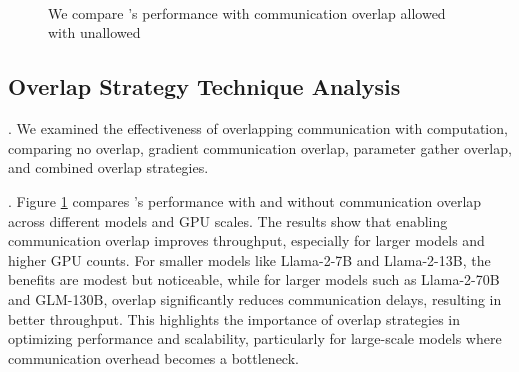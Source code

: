 

\begin{figure}[htbp]
  \centering
    \\
    \addtocounter{subfigure}{-1}
    
    \\
    \\
  \caption{
  We compare \sysname's performance with communication overlap allowed with unallowed
  }
  \label{fig:ablation:overlap}
\end{figure}

\subsection{Overlap Strategy Technique Analysis}

. We examined the effectiveness of overlapping communication with computation, comparing no overlap, gradient communication overlap, parameter gather overlap, and combined overlap strategies.

.
Figure \ref{fig:ablation:overlap} compares \sysname’s performance with and without communication overlap across different models and GPU scales. The results show that enabling communication overlap improves throughput, especially for larger models and higher GPU counts. For smaller models like Llama-2-7B and Llama-2-13B, the benefits are modest but noticeable, while for larger models such as Llama-2-70B and GLM-130B, overlap significantly reduces communication delays, resulting in better throughput. This highlights the importance of overlap strategies in optimizing performance and scalability, particularly for large-scale models where communication overhead becomes a bottleneck.